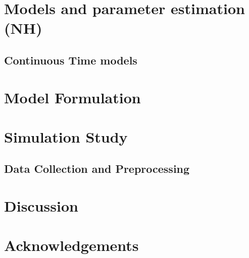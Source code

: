 \documentclass[12pt]{TD-CJS}
\begin{document}
%
%
\section{Models and parameter estimation (NH)}

%

%
%
\subsection{Continuous Time models}

%
\section{Model Formulation}

%
\section{Simulation Study}

%
\subsection{Data Collection and Preprocessing}
%
%
\section{Discussion}
%
%
\section{Acknowledgements}

\clearpage




\clearpage


\end{document}
